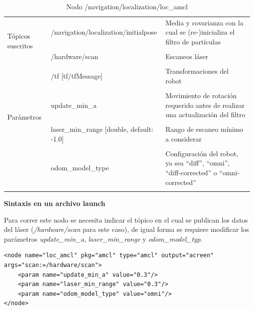 \documentclass[user_manual.tex]{subfiles}
\begin{document}
\begin{table}[H]
\begin{center}
\begin{tabular}{|l|p{6.6cm}|p{5cm}|}%
\hline

\multirow{4}{*}{Tópicos suscritos}
& /navigation/localization/initialpose  & Media y covarianza con la cual se (re-)inicializa el filtro de partículas \\
& & \\
& /hardware/scan  & Escaneos láser \\
& & \\
& /tf [tf/tfMessage] & Transformaciones del robot \\
& & \\
\cline{1-3}

\multirow{3}{*}{Parámetros}
& update\_min\_a  & Movimiento de rotación requerido antes de realizar una actualización del filtro \\
& & \\
& laser\_min\_range [double, default: -1.0] & Rango de escaneo mínimo a considerar \\
& & \\
& odom\_model\_type  & Configuración del robot, ya sea ``diff'', ``omni'', ``diff-corrected'' o ``omni-corrected'' \\
& & \\
\cline{1-3}

\end{tabular}
\caption{Nodo /navigation/localization/loc\_amcl}
\label{loc amcl node t2}
\end{center}
\end{table}

\textbf{Sintaxis en un archivo launch}

Para correr este nodo se necesita indicar el tópico en el cual se publican los datos del láser (\textit{/hardware/scan} para este caso), de igual forma se requiere modificar los parámetros \textit{update\_min\_a}, \textit{laser\_min\_range} y \textit{odom\_model\_typ}.\\
\begin{verbatim}
<node name="loc_amcl" pkg="amcl" type="amcl" output="acreen" 
args="scan:=/hardware/scan">
    <param name="update_min_a" value="0.3"/>
    <param name="laser_min_range" value="0.3"/>
    <param name="odom_model_type" value="omni"/>
</node>
\end{verbatim}
\end{document}
